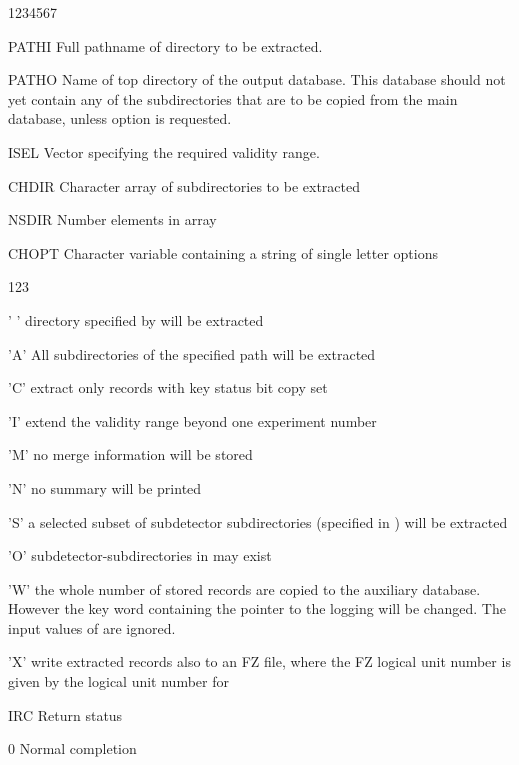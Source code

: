 
\begin{DLtt}{1234567}
\item[PATHI]Full pathname of directory to be extracted.
\item[PATHO]Name of top directory of the output database.
  This database should not yet contain any of the
  subdirectories that are to be copied from the main database, unless
option  is requested.
\item[ISEL]Vector specifying the required validity range.
\item[CHDIR]Character array of subdirectories to be extracted
\item[NSDIR]Number elements in array 
\item[CHOPT]Character variable containing a string of single letter options
  \begin{DLtt}{123}
    \item[' ']directory specified by  will be extracted
    \item['A']All subdirectories of the specified path will be extracted
    \item['C']extract only records with key status bit copy set
    \item['I']extend the validity range beyond one experiment number
    \item['M']no merge information will be stored
    \item['N']no summary will be printed
    \item['S']a selected subset of subdetector subdirectories
    (specified in ) will be extracted
    \item['O']subdetector-subdirectories in  may exist
    \item['W']the whole number of stored records are
      copied to the auxiliary database. However
      the key word containing the pointer to the
      logging will be changed. The input values of  are ignored.
    \item['X']write extracted records also to an FZ file,
      where the FZ logical unit number is given by
      the logical unit number for 
  \end{DLtt}
\item[IRC]Return status
  \begin{DLtt}{1}
    \item[0]Normal completion
  \end{DLtt}
\end{DLtt}

